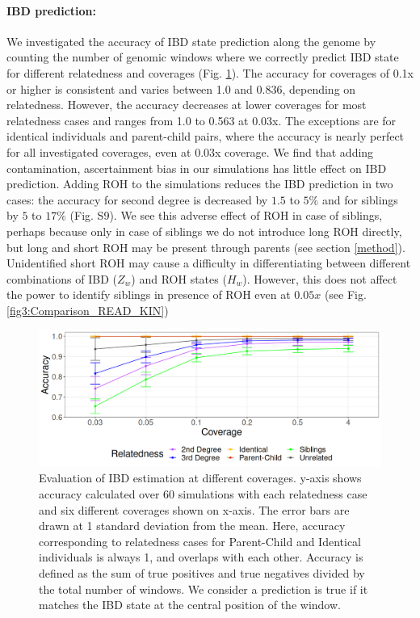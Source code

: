 \documentclass[12pt, letterpaper]{article}
\begin{document}
\paragraph{IBD prediction:}
We investigated the accuracy of IBD state prediction along the genome by counting the number of genomic windows where we correctly predict IBD state for different relatedness and coverages (Fig. \ref{fig4:IBDstate_accuracy}). The accuracy for coverages of 0.1x or higher is consistent and varies between 1.0 and 0.836, depending on relatedness. However, the accuracy decreases at lower coverages for most relatedness cases and ranges from 1.0 to 0.563 at 0.03x. The exceptions are for identical individuals and parent-child pairs, where the accuracy is nearly perfect for all investigated coverages, even at 0.03x coverage. We find that adding contamination, ascertainment bias in our simulations has little effect on IBD prediction. Adding ROH to the simulations reduces the IBD prediction in two cases: the accuracy for second degree is decreased by $1.5$ to $5\%$ and for siblings by $5$ to $17\%$ (Fig. S9). We see this adverse effect of ROH in case of siblings, perhaps because only in case of siblings we do not introduce long ROH directly, but long and short ROH may be present through parents (see section \ref{method}). Unidentified short ROH may cause a difficulty in differentiating between different combinations of IBD ($Z_w$) and ROH states ($H_w$). However, this does not affect the power to identify siblings in presence of ROH even at $0.05x$ (see Fig. \ref{fig3:Comparison_READ_KIN})


\begin{figure}[h!]
    \includegraphics[width=16cm]{plots/plotimg/plot_IBDaccuracy.png}
    \centering
    \caption{Evaluation of IBD estimation at different coverages. y-axis shows accuracy calculated over 60 simulations with each relatedness case and six different coverages shown on x-axis. The error bars are drawn at 1 standard deviation from the mean. Here, accuracy corresponding to relatedness cases for Parent-Child and Identical individuals is always 1, and overlaps with each other. Accuracy is defined as the sum of true positives and true negatives divided by the total number of windows. We consider a prediction is true if it matches the IBD state at the central position of the window.}
    \label{fig4:IBDstate_accuracy}
\end{figure}
\end{document}
